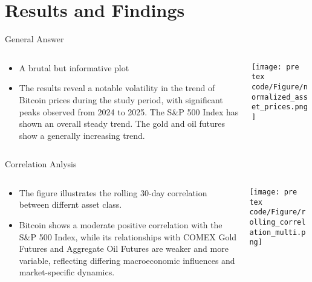 \section{Results and Findings}
    \begin{frame}{General Answer}
        \begin{columns}
        \begin{column}{0.5\textwidth}
        \begin{itemize}
            \item<1-> A brutal but informative plot
            \item<2->The results reveal a notable volatility in the trend of Bitcoin prices during the study period, with significant peaks observed from 2024 to 2025. The S\&P 500 Index has shown an overall steady trend. The gold and oil futures show a generally increasing trend.
            
        \end{itemize}
        \end{column}
        \begin{column}{0.5\textwidth}  %
            \begin{center}
             \texttt{[image: pre tex code/Figure/normalized\_asset\_prices.png]}
             \end{center}
        \end{column}
        \end{columns}
    \end{frame}

    \begin{frame}{Correlation Anlysis}
        \begin{columns}
        \begin{column}{0.5\textwidth}
        \begin{itemize}
            \item<1-> The figure illustrates the rolling 30-day correlation between differnt asset class.
            \item<2-> Bitcoin shows a moderate positive correlation with the S\&P 500 Index, while its relationships with COMEX Gold Futures and Aggregate Oil Futures are weaker and more variable, reflecting differing macroeconomic influences and market-specific dynamics.
           
        \end{itemize}
        \end{column}
        \begin{column}{0.6\textwidth}  %
            \begin{center}
             \texttt{[image: pre tex code/Figure/rolling\_correlation\_multi.png]}
             \end{center}
        \end{column}
        \end{columns}
    \end{frame}

